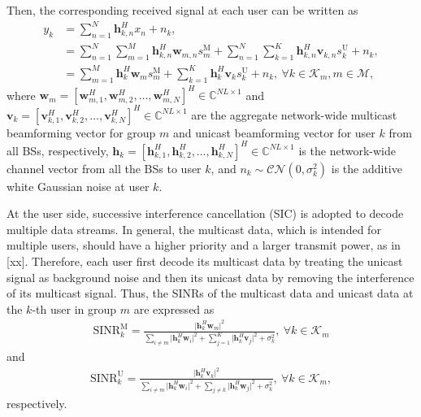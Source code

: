 \documentclass[12pt, draftclsnofoot, onecolumn]{IEEEtran}
\begin{document}
Then, the corresponding received signal at each user can be written as
\begin{align}
y_{k} 
&= \sum_{n = 1}^N \mathbf{h}_{k,n}^H x_{n} + n_k, \nonumber \\
&= \sum_{n = 1}^N \sum_{m=1}^M \mathbf{h}_{k,n}^H \mathbf{w}_{m,n} s_{m}^{\text{M}} + \sum_{n = 1}^N \sum_{k=1}^K \mathbf{h}_{k,n}^H \mathbf{v}_{k,n} s_{k}^{\text{U}} + n_k, \nonumber \\
&= \sum_{m=1}^M \mathbf{h}_{k}^H \mathbf{w}_{m} s_{m}^{\text{M}} + \sum_{k=1}^K \mathbf{h}_{k}^H \mathbf{v}_{k} s_{k}^{\text{U}} + n_k,~\forall k \in \mathcal{K}_m, m \in \mathcal{M},
\end{align}
where $\mathbf{w}_{m} = [\mathbf{w}_{m,1}^H,\mathbf{w}_{m,2}^H, \dots, \mathbf{w}_{m,N}^H ]^H \in \mathbb{C}^{NL\times 1}$ and $\mathbf{v}_{k} = [\mathbf{v}_{k,1}^H,\mathbf{v}_{k,2}^H, \dots, \mathbf{v}_{k,N}^H ]^H \in \mathbb{C}^{NL\times 1}$ are the aggregate network-wide multicast beamforming vector for group $m$ and unicast beamforming vector for user $k$ from all BSs, respectively, $\mathbf{h}_k = [\mathbf{h}_{k,1}^H,\mathbf{h}_{k,2}^H, \dots, \mathbf{h}_{k,N}^H ]^H \in \mathbb{C}^{NL\times 1}$ is the network-wide channel vector from all the BSs to user $k$, and $n_k \sim \mathcal{CN}(0,\sigma_k^2)$ is the additive white Gaussian noise at user $k$.


At the user side, successive interference cancellation (SIC) is adopted to decode multiple data streams. In general, the multicast data, which is intended for multiple users, should have a higher priority and a larger transmit power, as in [xx]. Therefore, each user first decode its multicast data by treating the unicast signal as background noise and then its unicast data by removing the interference of its multicast signal.
Thus, the SINRs of the multicast data and unicast data at the $k$-th user in group $m$ are expressed as
\begin{align}
\text{SINR}_{k}^{\text{M}} = \frac {\lvert \mathbf{h}_k^H \mathbf{w}_{m} \rvert^2} {\sum_{i \neq m} \lvert \mathbf{h}_k^H \mathbf{w}_{i} \rvert^2 + \sum_{j = 1}^K \lvert \mathbf{h}_k^H \mathbf{v}_{j} \rvert^2 + \sigma_k^2}, ~\forall k \in \mathcal{K}_m
\end{align}
and 
\begin{align}
  \text{SINR}_{k}^{\text{U}} = \frac {\lvert \mathbf{h}_k^H \mathbf{v}_{k} \rvert^2} {\sum_{i \neq m} \lvert \mathbf{h}_k^H \mathbf{w}_{i} \rvert^2 + \sum_{j \neq k} \lvert \mathbf{h}_k^H \mathbf{w}_{j} \rvert^2 + \sigma_k^2}, ~\forall k \in \mathcal{K}_m,
\end{align}
respectively.
\end{document}
